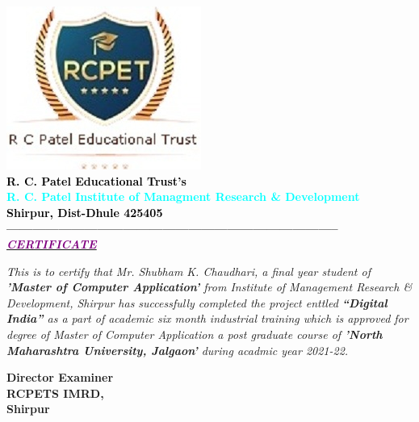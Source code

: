 \thispagestyle{empty}
\begin{center}
\includegraphics[scale=0.5]{Certi/111}\\[0.1cm]
\normalsize \bfseries \textcolor{black} {R. C. Patel Educational Trust's}\\[0.1cm]
\LARGE \bfseries \textcolor{cyan} {R. C. Patel Institute of Managment Research \& Development }\\[0.1cm]
\large \bfseries \textcolor{black} {Shirpur, Dist-Dhule 425405}\\[0.1cm]
----------------------------------------------------------------------------- \\[0.9cm]

\underline{\textit{\LARGE \textcolor{purple} {CERTIFICATE}}}\\[0.1cm]
\end{center}
\begin{flushleft}
\justifying
\begin{spacing}{2}


\textit{\large \textcolor{black}  This is to certify that Mr. Shubham K. Chaudhari, a final year student of \textbf {'Master of Computer Application'} from Institute of Management Research \& Development, Shirpur has successfully completed the project enttled \textbf{``Digital India''} as a part of academic six month industrial training which is approved for degree of Master of Computer Application a post graduate course of \textbf {'North Maharashtra University, Jalgaon'} during acadmic year 2021-22.}   \\[0.9cm]


\end{spacing}
\noindent
\textbf{Director \hspace{9cm} Examiner\\RCPETS IMRD,\\ Shirpur}\\[1.5cm]
\end{flushleft}
